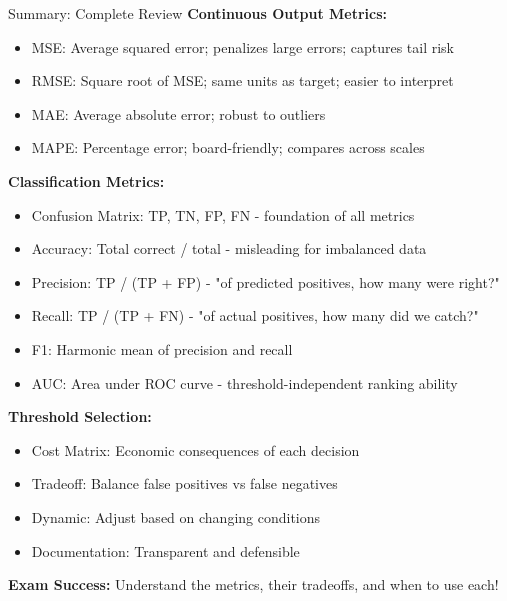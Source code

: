 \documentclass[8pt]{beamer}
\begin{document}

\begin{frame}{Summary: Complete Review}
	\fontsize{6.5}{7.5}\selectfont
	\textbf{\textcolor{myblue}{Continuous Output Metrics:}}
	\begin{itemize}
		\item \textcolor{myblue}{MSE:} Average squared error; penalizes large errors; captures tail risk
		\item \textcolor{myblue}{RMSE:} Square root of MSE; same units as target; easier to interpret
		\item \textcolor{myblue}{MAE:} Average absolute error; robust to outliers
		\item \textcolor{myblue}{MAPE:} Percentage error; board-friendly; compares across scales
	\end{itemize}
	
	\vspace{0.1cm}
	\textbf{\textcolor{myblue}{Classification Metrics:}}
	\begin{itemize}
		\item \textcolor{myblue}{Confusion Matrix:} TP, TN, FP, FN - foundation of all metrics
		\item \textcolor{myblue}{Accuracy:} Total correct / total - misleading for imbalanced data
		\item \textcolor{myblue}{Precision:} TP / (TP + FP) - "of predicted positives, how many were right?"
		\item \textcolor{myblue}{Recall:} TP / (TP + FN) - "of actual positives, how many did we catch?"
		\item \textcolor{myblue}{F1:} Harmonic mean of precision and recall
		\item \textcolor{myblue}{AUC:} Area under ROC curve - threshold-independent ranking ability
	\end{itemize}
	
	\vspace{0.1cm}
	\textbf{\textcolor{myblue}{Threshold Selection:}}
	\begin{itemize}
		\item \textcolor{myblue}{Cost Matrix:} Economic consequences of each decision
		\item \textcolor{myblue}{Tradeoff:} Balance false positives vs false negatives
		\item \textcolor{myblue}{Dynamic:} Adjust based on changing conditions
		\item \textcolor{myblue}{Documentation:} Transparent and defensible
	\end{itemize}
	
	\vspace{0.1cm}
	\textcolor{myred}{\textbf{Exam Success:}} Understand the metrics, their tradeoffs, and when to use each!
\end{frame}
\end{document}
